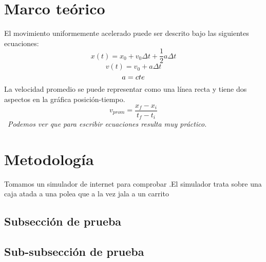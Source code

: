 \documentclass[12pt]{article}
\begin{document}
\section{Marco teórico}
El movimiento uniformemente acelerado puede ser descrito bajo las siguientes ecuaciones:\\
\begin{equation}
x(t)=x_{0}+v_{0}\Delta t+\frac{1}{2} a\Delta t
\label{eq1}
\end{equation}
\begin{equation}
v(t)=v_{0}+a\Delta t
\label{eq2}
\end{equation}
\begin{equation}
\notag a=cte
\end{equation}
La velocidad promedio se puede representar como una línea recta y tiene dos aspectos en la gráfica posición-tiempo. \\
\begin{equation}
v_{prom}=\frac{x_{f}-x_{i}}{t_{f}-t_{i}}    
\label{eq3}
\end{equation}
\
\textit{Podemos ver que para escribir ecuaciones resulta muy práctico.}

\section{Metodología}
Tomamos un simulador de internet para comprobar .El simulador trata sobre una caja atada a una polea que a la vez jala a un carrito\\
\subsection{Subsección de prueba}
	\subsection{Sub-subsección de prueba}
\end{document}
